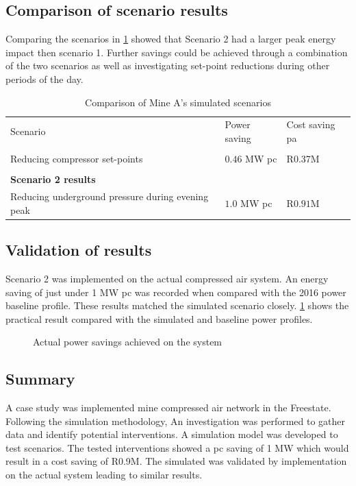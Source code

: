 \subsection{Comparison of scenario results}
Comparing the scenarios in \cref{Table: A Comparison} showed that Scenario 2 had a larger peak energy impact then scenario 1. Further savings could be achieved through a combination of the two scenarios as well as investigating set-point reductions during other periods of the day.
\begin{table}[h!]
	\centering
	\begin{tabular}{p{}
			p{}
			p{}}
		\hline 
		Scenario  &  Power saving & Cost saving \gls{pa}  \\
		\hhline{===} 
		\multicolumn{3}{l}{\textbf{Scenario 1 results}} \\
		Reducing compressor set-points & $ 0.46 $ MW \gls{pc} & R0.37M \\
		\\
		\multicolumn{3}{l}{\textbf{Scenario 2 results}}  \\
		Reducing underground pressure during evening peak& $ 1.0 $ MW \gls{pc} & R$ 0.91 $M\\
		\hline
	\end{tabular}
	\caption{Comparison of Mine A's simulated scenarios}
	\label{Table: A Comparison}
\end{table}

\subsection{Validation of results}
Scenario 2 was implemented on the actual compressed air system. An energy saving of just under 1 MW \gls{pc} was recorded when compared with the 2016 power baseline profile. These results matched the simulated scenario closely. \cref{fig: Actual permormance beet} shows the practical result compared with the simulated and baseline power profiles.
\begin{figure}[h]
	\centering
	
	\caption{Actual power savings achieved on the system}
	\label{fig: Actual permormance beet}
\end{figure}
\subsection{Summary}
A case study was implemented mine compressed air network in the Freestate. Following the simulation methodology, An investigation was performed to gather data and identify potential interventions. A simulation model was developed to test scenarios. The tested interventions showed a \gls{pc} saving of 1 MW which would result in a cost saving of R0.9M. The simulated was validated by implementation on the actual system leading to similar results.
\clearpage
